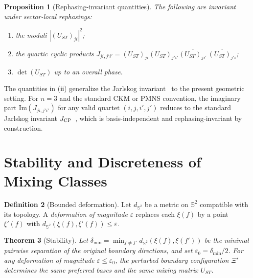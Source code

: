 \documentclass[12pt]{article}
\newtheorem{theorem}{Theorem}[section]
\newtheorem{proposition}[theorem]{Proposition}
\theoremstyle{definition}
\newtheorem{definition}[theorem]{Definition}
\theoremstyle{remark}
\newcommand{\Sphere}{\mathbb{S}^2}
\begin{document}
\begin{proposition}[Rephasing-invariant quantities]\label{prop:rephinv}
The following are invariant under sector-local rephasings:
\begin{enumerate}
\item[\emph{(i)}] the moduli $|(U_{ST})_{ji}|^2$;
\item[\emph{(ii)}] the quartic cyclic products
  $J_{ji,j'i'}=(U_{ST})_{ji}(U_{ST})_{j'i'}
   \overline{(U_{ST})_{ji'}}\,\overline{(U_{ST})_{j'i}}$;
\item[\emph{(iii)}] $\det(U_{ST})$ up to an overall phase.
\end{enumerate}
\end{proposition}

The quantities in (ii) generalize the Jarlskog invariant~\cite{Jarlskog}
to the present geometric setting.
For $n=3$ and the standard CKM or PMNS convention, the imaginary part
$\mathrm{Im}(J_{ji,j'i'})$ for any valid quartet $(i,j,i',j')$ reduces
to the standard Jarlskog invariant $J_{\rm CP}$~\cite{Jarlskog},
which is basis-independent and rephasing-invariant by construction.

\section{Stability and Discreteness of Mixing Classes}
\label{sec:stability}

\begin{definition}[Bounded deformation]
Let $d_{\Sphere}$ be a metric on $\Sphere$ compatible with its topology.
A \emph{deformation of magnitude $\varepsilon$} replaces each $\xi(f)$
by a point $\xi'(f)$ with $d_{\Sphere}(\xi(f),\xi'(f))\leq\varepsilon$.
\end{definition}

\begin{theorem}[Stability]\label{thm:stability}
Let $\delta_{\min}=\min_{f\neq f'}d_{\Sphere}(\xi(f),\xi(f'))$ be the
minimal pairwise separation of the original boundary directions, and set
$\varepsilon_0=\delta_{\min}/2$.
For any deformation of magnitude $\varepsilon\leq\varepsilon_0$, the
perturbed boundary configuration $\Xi'$ determines the same preferred
bases and the same mixing matrix $U_{ST}$.
\end{theorem}
\end{document}
